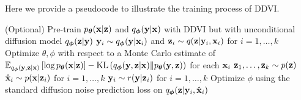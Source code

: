 Here we provide a pseudocode to illustrate the training process of DDVI. 
\begin{algorithm*}[h]
\caption{DDVI Pseudocode}
\begin{algorithmic}[1]
\State (Optional) Pre-train $p_\theta(\bx|\bz)$ and $q_\phi(\by|\bx)$ with DDVI but with unconditional diffusion model $q_\phi(\bz|\by)$
        \State $\by_i \sim q_\phi(\by|\bx_i)$ and $\mathbf{z}_i \sim q(\mathbf{z}|\mathbf{y}_i, \mathbf{x}_i)$ for $i = 1, \ldots, k$
        \State Optimize $\theta, \phi$ with respect to a Monte Carlo estimate of $\mathbb{E}_{q_\phi(\by,\bz|\bx)} \left[ \log p_\theta(\bx|\bz) \right] - \mathrm{KL}\left(q_\phi(\by,\bz|\bx) \| p_\theta(\by,\bz) \right)$ for each $\mathbf{x}_i$ 
         
            \State $\mathbf{z}_{1}, \ldots, \mathbf{z}_{k} \sim p(\mathbf{z})$ 
            \State $\hat{\mathbf{x}}_i \sim p(\mathbf{x}|\mathbf{z}_i)$ for $i = 1, \ldots, k$ 
            \State $\mathbf{y}_i \sim r(\mathbf{y}|\mathbf{z}_i)$ for $i = 1, \ldots, k$ 
            \State Optimize $\phi$ using the standard diffusion noise prediction loss on $q_\phi(\bz|\by_i, \hat{\bx}_i)$
        \EndFor
    \EndFor
\EndFor
\end{algorithmic}
\label{alg:ddvi}
\end{algorithm*}

